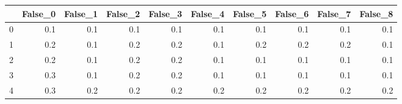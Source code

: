 \begin{tabular}{lrrrrrrrrr}
\toprule
{} &  False\_0 &  False\_1 &  False\_2 &  False\_3 &  False\_4 &  False\_5 &  False\_6 &  False\_7 &  False\_8 \\ \hline
\midrule
0 &      0.1 &      0.1 &      0.1 &      0.1 &      0.1 &      0.1 &      0.1 &      0.1 &      0.1 \\ \hline
1 &      0.2 &      0.1 &      0.2 &      0.2 &      0.1 &      0.2 &      0.2 &      0.2 &      0.1 \\ \hline
2 &      0.2 &      0.1 &      0.2 &      0.2 &      0.1 &      0.1 &      0.1 &      0.1 &      0.1 \\ \hline
3 &      0.3 &      0.1 &      0.2 &      0.2 &      0.1 &      0.1 &      0.1 &      0.1 &      0.1 \\ \hline
4 &      0.3 &      0.2 &      0.2 &      0.2 &      0.2 &      0.2 &      0.2 &      0.2 &      0.2 \\ \hline
\bottomrule
\end{tabular}
